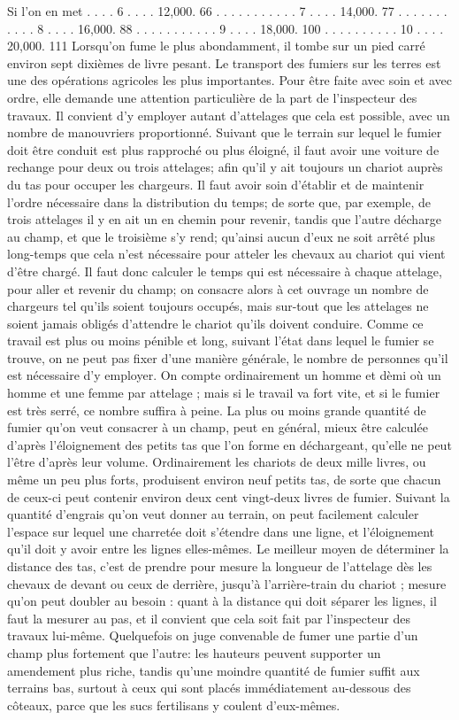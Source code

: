 Si l'on en met . . . . 6 . . . . 12,000. 66
. . . . . . . . . . . 7 . . . . 14,000. 77
. . . . . . . . . . . 8 . . . . 16,000. 88
. . . . . . . . . . . 9 . . . . 18,000. 100
. . . . . . . . . . 10 . . . . 20,000. 111
Lorsqu'on fume le plus abondamment, il tombe sur un pied carré environ sept dixièmes de livre pesant.
Le transport des fumiers sur les terres est une des opérations agricoles les plus importantes. Pour être faite avec soin et avec ordre, elle demande une attention particulière de la part de l'inspecteur des travaux. Il convient d'y employer autant d'attelages\setcounter{page}{50} que cela est possible, avec un nombre de manouvriers proportionné. Suivant que le terrain sur lequel le fumier doit être conduit est plus rapproché ou plus éloigné, il faut avoir une voiture de rechange pour deux ou trois attelages; afin qu'il y ait toujours un chariot auprès du tas pour occuper les chargeurs. Il faut avoir soin d'établir et de maintenir l'ordre nécessaire dans la distribution du temps; de sorte que, par exemple, de trois attelages il y en ait un en chemin pour revenir, tandis que l'autre décharge au champ, et que le troisième s'y rend; qu'ainsi aucun d'eux ne soit arrêté plus long-temps que cela n'est nécessaire pour atteler les chevaux au chariot qui vient d'être chargé. Il faut donc calculer le temps qui est nécessaire à chaque attelage, pour aller et revenir du champ; on consacre alors à cet ouvrage un nombre de chargeurs tel qu'ils soient toujours occupés, mais sur-tout que les attelages ne soient jamais obligés d'attendre le chariot qu'ils doivent conduire. Comme ce travail est plus ou moins pénible et long, suivant l'état dans lequel le fumier se trouve, on ne peut pas fixer d'une manière générale, le nombre de personnes qu'il est nécessaire d'y employer. On compte ordinairement un homme et\setcounter{page}{51} dèmi où un homme et une femme par attelage ; mais si le travail va fort vite, et si le fumier est très serré, ce nombre suffira à peine. La plus ou moins grande quantité de fumier qu'on veut consacrer à un champ, peut en général, mieux être calculée d'après l'éloignement des petits tas que l'on forme en déchargeant, qu'elle ne peut l'être d'après leur volume. Ordinairement les chariots de deux mille livres, ou même un peu plus forts, produisent environ neuf petits tas, de sorte que chacun de ceux-ci peut contenir environ deux cent vingt-deux livres de fumier. Suivant la quantité d'engrais qu'on veut donner au terrain, on peut facilement calculer l'espace sur lequel une charretée doit s'étendre dans une ligne, et l'éloignement qu'il doit y avoir entre les lignes elles-mêmes. Le meilleur moyen de déterminer la distance des tas, c'est de prendre pour mesure la longueur de l'attelage dès les chevaux de devant ou ceux de derrière, jusqu'à l'arrière-train du chariot ; mesure qu'on peut doubler au besoin : quant à la distance qui doit séparer les lignes, il faut la mesurer au pas, et il convient que cela soit fait par l'inspecteur des travaux lui-même. Quelquefois on juge convenable de fumer une\setcounter{page}{52} partie d'un champ plus fortement que l'autre: les hauteurs peuvent supporter un amendement plus riche, tandis qu'une moindre quantité de fumier suffit aux terrains bas, surtout à ceux qui sont placés immédiatement au-dessous des côteaux, parce que les sucs fertilisans y coulent d'eux-mêmes.
